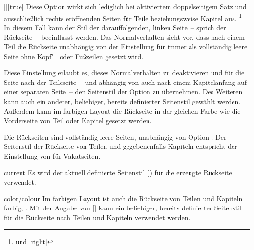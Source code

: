 \begin{Declaration}{[\PSet]}[true]%
\printdeclarationlist%
%
%
%
%
Diese Option wirkt sich lediglich bei aktiviertem doppelseitigem Satz und 
ausschließlich rechts eröffnenden Seiten für Teile beziehungsweise Kapitel
aus.%
\footnote{ und [right]}
In diesem Fall kann der Stil der darauffolgenden, linken Seite~-- sprich der 
Rückseite~-- beeinflusst werden. Das Normalverhalten sieht vor, dass nach einem 
Teil die Rückseite unabhängig von der Einstellung für  
immer als vollständig leere Seite ohne Kopf"~ oder Fußzeilen gesetzt wird.

Diese Einstellung erlaubt es, dieses Normalverhalten zu deaktivieren und für 
die Seite nach der Teileseite~-- und abhängig von  
auch nach einem Kapitelanfang auf einer separaten Seite~-- den Seitenstil der 
Option  zu übernehmen. Des Weiteren kann auch ein 
anderer, beliebiger, bereits definierter Seitenstil gewählt werden. Außerdem
kann im farbigen Layout die Rückseite in der gleichen Farbe wie die 
Vorderseite von Teil oder Kapitel gesetzt werden. \notudscrartcl
%
\begin{values}
\itemfalse
  Die Rückseiten sind vollständig leere Seiten, unabhängig von Option
  .
\itemtrue*
  Der Seitenstil der Rückseite von Teilen und gegebenenfalls Kapiteln 
  entspricht der Einstellung von  für Vakatseiten.
\item[current]
  Es wird der aktuell definierte Seitenstil () für die 
  erzeugte Rückseite verwendet.
\item[color/colour]
  Im farbigen Layout ist auch die Rückseite von Teilen und Kapiteln farbig, 
  .
\makeatletter{}\makeatother
  Mit der Angabe von [] 
  kann ein beliebiger, bereits definierter Seitenstil für die Rückseite nach 
  Teilen und Kapiteln verwendet werden.
\end{values}
\end{Declaration}

